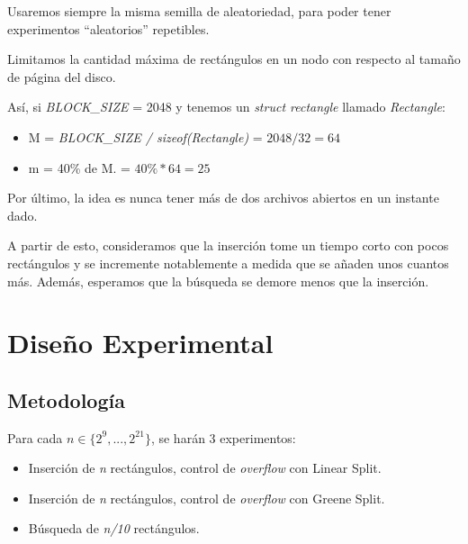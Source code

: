 \documentclass[letterpaper,10pt]{article}
\begin{document}
	Usaremos siempre la misma semilla de aleatoriedad, para poder tener experimentos ``aleatorios'' repetibles.

	Limitamos la cantidad máxima de rectángulos en un nodo con respecto al tamaño de página del disco.

	Así, si \textit{BLOCK\_SIZE} = 2048 y tenemos un \textit{struct rectangle} llamado \textit{Rectangle}:

	\begin{itemize}
		\item M = \textit{BLOCK\_SIZE / sizeof(Rectangle)} = $ 2048 / 32 = 64 $
		\item m = 40\% de M. = $ 40\% * 64 = 25 $
	\end{itemize}

	Por último, la idea es nunca tener más de dos archivos abiertos en un instante dado.

	A partir de esto, consideramos que la inserción tome un tiempo corto con pocos rectángulos y se incremente notablemente a medida que se añaden unos cuantos más.
	Además, esperamos que la búsqueda se demore menos que la inserción.

	\newpage

	\section{Diseño Experimental}

	\subsection{Metodología}

	Para cada $n \in \{2^{9}, ..., 2^{21}\}$, se harán 3 experimentos:

	\begin{itemize}
		\item Inserción de \textit{n} rectángulos, control de \textit{overflow} con Linear Split.
		\item Inserción de \textit{n} rectángulos, control de \textit{overflow} con Greene Split.
		\item Búsqueda de \textit{n/10} rectángulos.
	\end{itemize}
\end{document}
